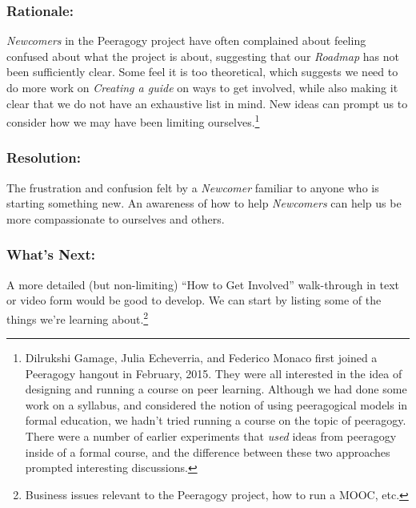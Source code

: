 \subsubsection*{Rationale:} \emph{Newcomers} in the Peeragogy project have often complained
about feeling confused about what the project is about, suggesting that our \emph{Roadmap}
has not been sufficiently clear.  Some feel it is too theoretical, which suggests
we need to do more work on \emph{Creating a guide} on ways to get involved, while also
making it clear that we do not have an exhaustive list in mind.  New ideas can prompt us to consider how we may have been limiting ourselves.\footnote{Dilrukshi Gamage, Julia Echeverria, and Federico Monaco first joined a Peeragogy hangout in February, 2015.  They were all interested in the idea of designing and running a course on peer learning.  Although we had done some work on a syllabus, and considered the notion of using peeragogical models in formal education, we hadn't tried running a course on the topic of peeragogy.  There were a number of earlier experiments that \emph{used} ideas from peeragogy inside of a formal course, and the difference between these two approaches prompted interesting discussions.}

\subsubsection*{Resolution:}
The frustration and confusion felt by a \emph{Newcomer} familiar to anyone who is starting something new.  An awareness of how to help \emph{Newcomers} can help us be more compassionate to ourselves and others.

\subsubsection*{What's Next:} A more detailed (but non-limiting) ``How to Get Involved'' walk-through in text or video form would be good to develop. We can start by listing some of the things we're learning about.\footnote{Business issues relevant to the Peeragogy project, how to run a MOOC, etc.}
